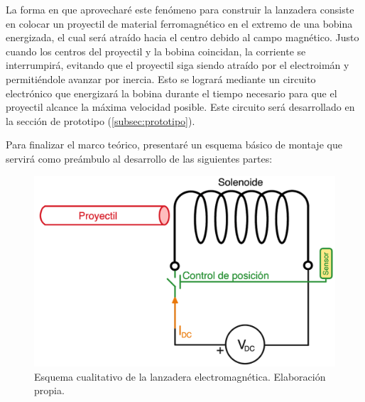 La forma en que aprovecharé este fenómeno para construir la lanzadera consiste en colocar un proyectil de material ferromagnético en el extremo de una bobina energizada, el cual será atraído hacia el centro debido al campo magnético. Justo cuando los centros del proyectil y la bobina coincidan, la corriente se interrumpirá, evitando que el proyectil siga siendo atraído por el electroimán y permitiéndole avanzar por inercia. Esto se logrará mediante un circuito electrónico que energizará la bobina durante el tiempo necesario para que el proyectil alcance la máxima velocidad posible. Este circuito será desarrollado en la sección de prototipo (\ref{subsec:prototipo}).

Para finalizar el marco teórico, presentaré un esquema básico de montaje que servirá como preámbulo al desarrollo de las siguientes partes:

\begin{figure}[H]
    \centering %
    \includegraphics[width=13cm]{FigurasMemoria/esquemabasico.png}
    \caption{Esquema cualitativo de la lanzadera electromagnética. Elaboración propia.}
    \label{fig:esquemabasico} %
\end{figure}
